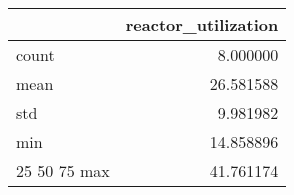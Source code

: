 \begin{tabular}{lr}
\toprule
 & reactor\_utilization \\
\midrule
count & 8.000000 \\
mean & 26.581588 \\
std & 9.981982 \\
min & 14.858896 \\
25%
50%
75%
max & 41.761174 \\
\bottomrule
\end{tabular}

